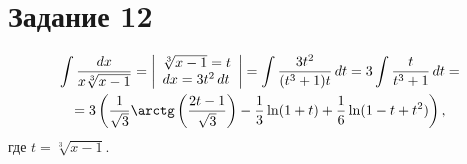 \section{Задание 12}

\begin{multline*}
    \int \frac{dx}{x \sqrt[3]{x-1}} =
    \left|\begin{array}{l}
        \sqrt[3]{x-1} = t \\
        dx = 3t^2 \, dt
    \end{array}\right| = 
    \int \frac{3t^2}{(t^3+1)t} \, dt = 3 \int \frac{t}{t^3+1} \, dt = \\ 
    = 3\left(\frac{1}{\sqrt{3}}\arctg\left(\frac{2t-1}{\sqrt{3}}\right) - 
    \frac{1}{3} \ln (1+t) + \frac{1}{6} \ln (1-t+t^2)\right),
\end{multline*}
где $ t = \sqrt[3]{x-1} $.

